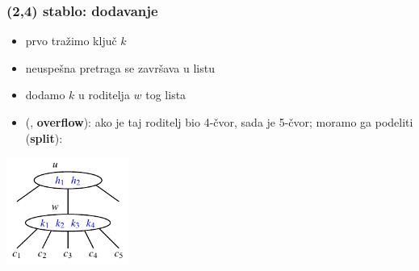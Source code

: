 \documentclass[compress]{beamer}
\begin{document}
\begin{frame}[fragile]
  \frametitle{(2,4) stablo: dodavanje}
  \begin{itemize}
    \item prvo tražimo ključ $k$
    \item neuspešna pretraga se završava u listu
    \item dodamo $k$ u roditelja $w$ tog lista 
    \item (, \textbf{overflow}): ako je taj roditelj bio 4-čvor, sada je 5-čvor; moramo ga podeliti (\textbf{split}):
  \end{itemize}
  \begin{center}
    \includegraphics[width=4cm]{asp-11-pic31.pdf}
  \end{center}
\end{frame}
\end{document}
